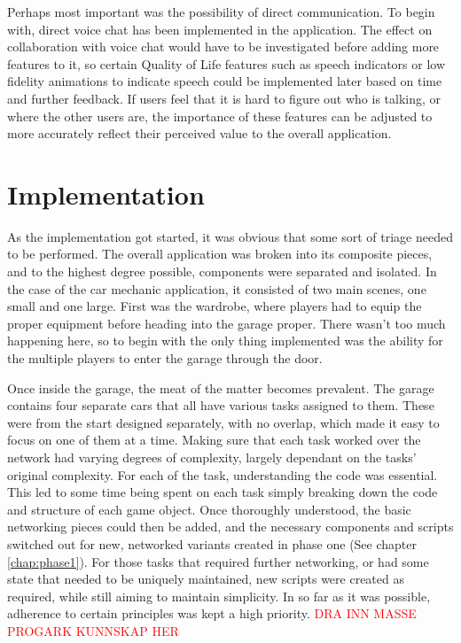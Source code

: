 Perhaps most important was the possibility of direct communication. To begin with, direct voice chat has been implemented in the application. The effect on collaboration with voice chat would have to be investigated before adding more features to it, so certain Quality of Life features such as speech indicators or low fidelity animations to indicate speech could be implemented later based on time and further feedback. If users feel that it is hard to figure out who is talking, or where the other users are, the importance of these features can be adjusted to more accurately reflect their perceived value to the overall application.


\section{Implementation}
\label{section:Phase2Implentation}
As the implementation got started, it was obvious that some sort of triage needed to be performed. The overall application was broken into its composite pieces, and to the highest degree possible, components were separated and isolated. In the case of the car mechanic application, it consisted of two main scenes, one small and one large. First was the wardrobe, where players had to equip the proper equipment before heading into the garage proper. There wasn't too much happening here, so to begin with the only thing implemented was the ability for the multiple players to enter the garage through the door.

Once inside the garage, the meat of the matter becomes prevalent. The garage contains four separate cars that all have various tasks assigned to them. These were from the start designed separately, with no overlap, which made it easy to focus on one of them at a time. Making sure that each task worked over the network had varying degrees of complexity, largely dependant on the tasks' original complexity. For each of the task, understanding the code was essential. This led to some time being spent on each task simply breaking down the code and structure of each game object. Once thoroughly understood, the basic networking pieces could then be added, and the necessary components and scripts switched out for new, networked variants created in phase one (See chapter \ref{chap:phase1}). For those tasks that required further networking, or had some state that needed to be uniquely maintained, new scripts were created as required, while still aiming to maintain simplicity.  In so far as it was possible, adherence to certain principles was kept a high priority. \textcolor{red}{DRA INN MASSE PROGARK KUNNSKAP HER}


